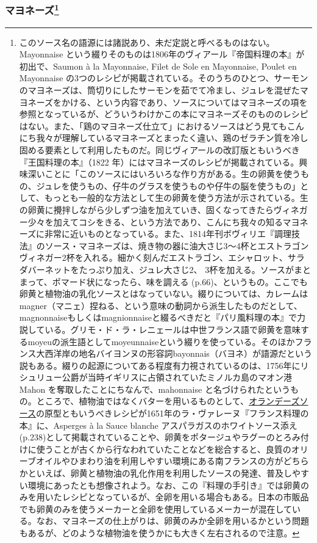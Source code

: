 \begin{recette}
{\subsubsection[マヨネーズ]{\texorpdfstring{マヨネーズ\footnote{このソース名の語源には諸説あり、未だ定説と呼べるものはない。
  Mayonnaise
  という綴りそのものは1806年のヴィアール『帝国料理の本』が初出で、Saumon
  à la Mayonnaise, Filet de Sole en Mayonnaise, Poulet en Mayonnaise
  の3つのレシピが掲載されている。そのうちのひとつ、サーモンのマヨネーズは、筒切りにしたサーモンを茹でて冷まし、ジュレを混ぜたマヨネーズをかける、という内容であり、ソースについてはマヨネーズの項を参照となっているが、どういうわけかこの本にマヨネーズそのもののレシピはない。また、「鶏のマヨネーズ仕立て」におけるソースはどう見てもこんにち我々が理解しているマヨネーズとまったく違い、鶏のゼラチン質を冷し固める要素として利用したものだ。同じヴィアールの改訂版ともいうべき『王国料理の本』（1822
  年）にはマヨネーズのレシピが掲載されている。興味深いことに「このソースにはいろいろな作り方がある。生の卵黄を使うもの、ジュレを使うもの、仔牛のグラスを使うものや仔牛の脳を使うもの」として、もっとも一般的な方法として生の卵黄を使う方法が示されている。生の卵黄に攪拌しながら少しずつ油を加えていき、固くなってきたらヴィネガー少々を加えてコシをきる、という方法であり、こんにち我々の知るマヨネーズに非常に近いものとなっている。また、1814年刊ボヴィリエ『調理技法』のソース・マヨネーズは、焼き物の器に油大さじ3〜4杯とエストラゴンヴィネガー2杯を入れる。細かく刻んだエストラゴン、エシャロット、サラダバーネットをたっぷり加え、ジュレ大さじ2、
  3杯を加える。ソースがまとまって、ポマード状になったら、味を調える
  (p.66)、というもの。ここでも卵黄と植物油の乳化ソースとはなっていない。綴りについては、カレームはmagner（マニェ）捏ねる、という意味の動詞から派生したものだとして、magnonnaiseもしくはmagnionnaiseと綴るべきだと『パリ風料理の本』で力説している。グリモ・ド・ラ・レニェールは中世フランス語で卵黄を意味するmoyeuの派生語としてmoyeunnaiseという綴りを使っている。そのほかフランス大西洋岸の地名バイヨンヌの形容詞bayonnais（バヨネ）が語源だという説もある。綴りの起源についてある程度有力視されているのは、1756年にリシュリュー公爵が当時イギリスに占領されていたミノルカ島のマオン港
  Mahon を奪取したことにちなんで、mahonnaise
  と名づけられたというもの。ところで、植物油ではなくバターを用いるものとして、\protect\hyperlink{sauce-hollandaise}{オランデーズソース}の原型ともいうべきレシピが1651年のラ・ヴァレーヌ『フランス料理の本』に、Asperges
  à la Sauce blanche
  アスパラガスのホワイトソース添え(p.238)として掲載されていることや、卵黄をポタージュやラグーのとろみ付けに使うことが古くから行なわれていたことなどを総合すると、良質のオリーブオイルやひまわり油を利用しやすい環境にある南フランスの方がどちらかといえば、卵黄と植物油の乳化作用を利用したソースの発達、普及しやすい環境にあったとも想像されよう。なお、この『料理の手引き』では卵黄のみを用いたレシピとなっているが、全卵を用いる場合もある。日本の市販品でも卵黄のみを使うメーカーと全卵を使用しているメーカーが混在している。なお、マヨネーズの仕上がりは、卵黄のみか全卵を用いるかという問題もあるが、どのような植物油を使うかにも大きく左右されるので注意。}}{マヨネーズ}}\label{mayonnaise}}


\end{recette}
